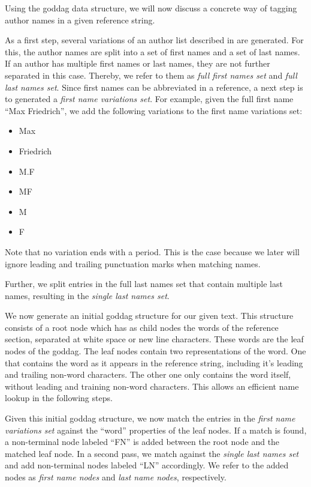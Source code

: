 \bigskip

Using the \gls{goddag} data structure, we will now discuss a concrete way of tagging author names in a given reference string.

As a first step, several variations of an author list described in  are generated.
For this, the author names are split into a set of first names and a set of last names.
If an author has multiple first names or last names, they are not further separated in this case.
Thereby, we refer to them as \textit{full first names set} and \textit{full last names set}.
Since first names can be abbreviated in a reference, a next step is to generated a \textit{first name variations set}.
For example, given the full first name ``Max Friedrich'', we add the following variations to the first name variations set:
\begin{itemize}
  \itemsep0em
  \item Max
  \item Friedrich
  \item M.F
  \item MF
  \item M
  \item F
\end{itemize}
Note that no variation ends with a period.
This is the case because we later will ignore leading and trailing punctuation marks when matching names.

Further, we split entries in the full last names set that contain multiple last names, resulting in the \textit{single last names set}.

\bigskip

We now generate an initial \gls{goddag} structure for our given text.
This structure consists of a root node which has as child nodes the words of the reference section, separated at white space or new line characters.
These words are the leaf nodes of the \gls{goddag}.
The leaf nodes contain two representations of the word.
One that contains the word as it appears in the reference string, including it's leading and trailing non-word characters.
The other one only contains the word itself, without leading and training non-word characters.
This allows an efficient name lookup in the following steps.

Given this initial \gls{goddag} structure, we now match the entries in the \textit{first name variations set} against the ``word'' properties of the leaf nodes.
If a match is found, a non-terminal node labeled ``FN'' is added between the root node and the matched leaf node.
In a second pass, we match against the \textit{single last names set} and add non-terminal nodes labeled ``LN'' accordingly.
We refer to the added nodes as \textit{first name nodes} and \textit{last name nodes}, respectively.


